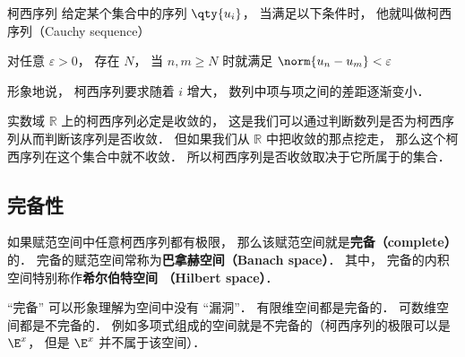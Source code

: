 

\begin{definition}{柯西序列}
给定某个集合中的序列 $\qty{u_i}$， 当满足以下条件时， 他就叫做柯西序列（Cauchy sequence）

对任意 $\varepsilon > 0$， 存在 $N$， 当 $n, m \geqslant N$ 时就满足 $\norm{u_n - u_m} < \varepsilon$
\end{definition}

形象地说， 柯西序列要求随着 $i$ 增大， 数列中项与项之间的差距逐渐变小．

实数域 $\mathbb R$ 上的柯西序列必定是收敛的， 这是我们可以通过判断数列是否为柯西序列从而判断该序列是否收敛． 但如果我们从 $\mathbb R$ 中把收敛的那点挖走， 那么这个柯西序列在这个集合中就不收敛． 所以柯西序列是否收敛取决于它所属于的集合． %

\subsection{完备性}
如果赋范空间中任意柯西序列都有极限， 那么该赋范空间就是\textbf{完备（complete）}的． 完备的赋范空间常称为\textbf{巴拿赫空间（Banach space）}． 其中， 完备的内积空间特别称作\textbf{希尔伯特空间 （Hilbert space）}．

“完备” 可以形象理解为空间中没有 “漏洞”． 有限维空间都是完备的． 可数维空间都是不完备的． 例如多项式组成的空间就是不完备的（柯西序列的极限可以是 $\E^x$， 但是 $\E^x$ 并不属于该空间）．
